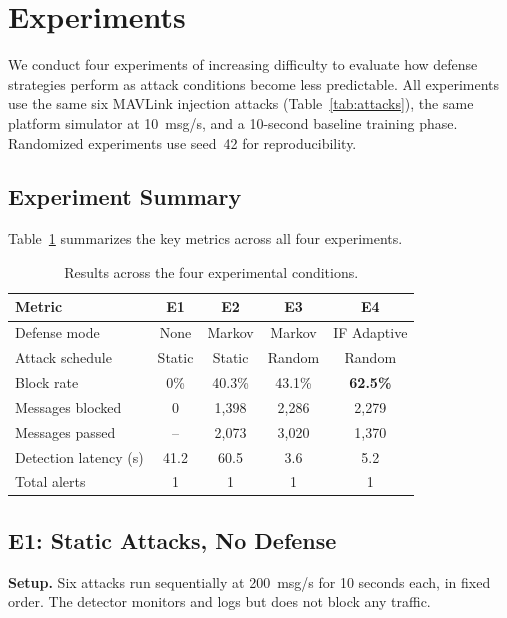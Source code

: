 \section{Experiments} \label{sec:experiments}

We conduct four experiments of increasing difficulty to evaluate how
defense strategies perform as attack conditions become less predictable.
All experiments use the same six MAVLink injection attacks
(Table~\ref{tab:attacks}), the same platform simulator at 10~msg/s, and
a 10-second baseline training phase.  Randomized experiments use seed~42
for reproducibility.

\subsection{Experiment Summary}

Table~\ref{tab:results} summarizes the key metrics across all four
experiments.

\begin{table}[t]
\centering
\caption{Results across the four experimental conditions.}
\label{tab:results}
\begin{tabular}{lcccc}
\toprule
\textbf{Metric} & \textbf{E1} & \textbf{E2} & \textbf{E3} & \textbf{E4} \\
\midrule
Defense mode     & None & Markov & Markov & IF Adaptive \\
Attack schedule  & Static & Static & Random & Random \\
Block rate       & 0\%  & 40.3\% & 43.1\% & \textbf{62.5\%} \\
Messages blocked & 0    & 1{,}398  & 2{,}286  & 2{,}279 \\
Messages passed  & --   & 2{,}073  & 3{,}020  & 1{,}370 \\
Detection latency (s) & 41.2 & 60.5 & 3.6 & 5.2 \\
Total alerts     & 1    & 1    & 1    & 1 \\
\bottomrule
\end{tabular}
\end{table}

\subsection{E1: Static Attacks, No Defense}

\textbf{Setup.}  Six attacks run sequentially at 200~msg/s for 10
seconds each, in fixed order.  The detector monitors and logs but does
not block any traffic.

